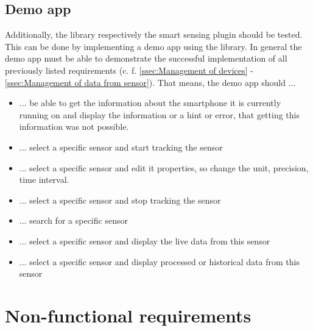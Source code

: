 \documentclass[12pt]{article}
\newcounter{fr}
\begin{document}
\subsection{Demo app}
\label{ssec:demoapp}
Additionally, the library respectively the smart sensing plugin should be tested. This can be done by implementing a demo app using the library. In general the demo app must be able to demonstrate the successful implementation of all previously listed requirements (c. f. \ref{ssec:Management of devices} - \ref{ssec:Management of data from sensor}). That means, the demo app should ... 
\begin{itemize}
    \item ... be able to get the information about the smartphone it is currently running on and display the information or a hint or error, that getting this information was not possible.
    \item ... select a specific sensor and start tracking the sensor
    \item ... select a specific sensor and edit it properties, so change the unit, precision, time interval.
    \item ... select a specific sensor and stop tracking the sensor
    \item ... search for a specific sensor
    \item ... select a specific sensor and display the live data from this sensor
    \item ... select a specific sensor and display processed or historical data from this sensor
\end{itemize}

\section{Non-functional requirements}
\end{document}
